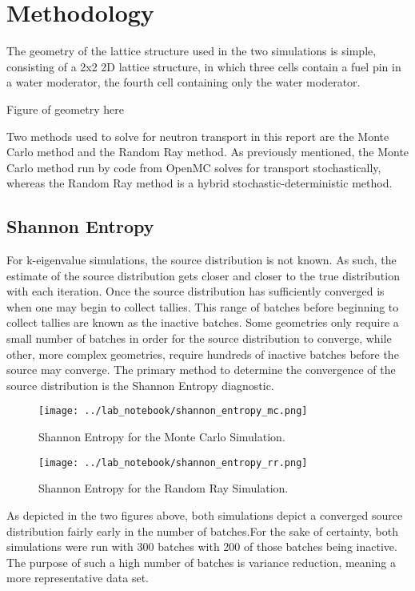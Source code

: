 \pagebreak
\section{Methodology}
\label{sec:methods}
The geometry of the lattice structure used in the two simulations is simple, consisting of a 2x2 2D lattice structure, in which three cells contain a fuel pin in a water moderator, the fourth cell containing only the water moderator.

Figure of geometry here

Two methods used to solve for neutron transport in this report are the Monte Carlo method and the Random Ray method. As previously mentioned, the Monte Carlo method run by code from OpenMC solves for transport stochastically, whereas the Random Ray method is a hybrid stochastic-deterministic method.

\pagebreak
\subsection{Shannon Entropy}
For k-eigenvalue simulations, the source distribution is not known. As such, the estimate of the source distribution gets closer and closer to the true distribution with each iteration. Once the source distribution has sufficiently converged is when one may begin to collect tallies. This range of batches before beginning to collect tallies are known as the inactive batches. Some geometries only require a small number of batches in order for the source distribution to converge, while other, more complex geometries, require hundreds of inactive batches before the source may converge. The primary method to determine the convergence of the source distribution is the Shannon Entropy diagnostic.

\begin{figure}[htbp!]
        \begin{center}
                \texttt{[image: ../lab\_notebook/shannon\_entropy\_mc.png]}
        \end{center}
        \caption{Shannon Entropy for the Monte Carlo Simulation.}
        \label{fig:shannon_entropy_mc}
\end{figure}

\begin{figure}[htbp!]
        \begin{center}
                \texttt{[image: ../lab\_notebook/shannon\_entropy\_rr.png]}
        \end{center}
        \caption{Shannon Entropy for the Random Ray Simulation.}
        \label{fig:shannon_entropy_rr}
\end{figure}

As depicted in the two figures above, both simulations depict a converged source distribution fairly early in the number of batches.For the sake of certainty, both simulations were run with 300 batches with 200 of those batches being inactive. The purpose of such a high number of batches is variance reduction, meaning a more representative data set.


